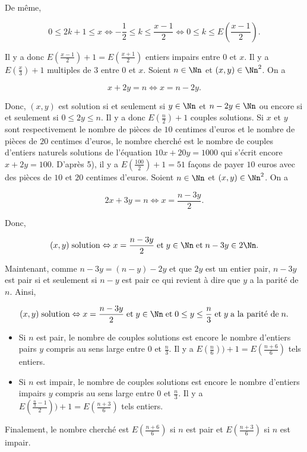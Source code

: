 {\begin{enumerate}
{De même,

$$0\leq2k+1\leq x\Leftrightarrow-\frac{1}{2}\leq k\leq\frac{x-1}{2}\Leftrightarrow0\leq k\leq E(\frac{x-1}{2}).$$

Il y a donc $E(\frac{x-1}{2})+1=E(\frac{x+1}{2})$ entiers impairs entre $0$ et $x$.
Il y a $E(\frac{x}{3})+1$ multiples de $3$ entre $0$ et $x$.
Soient $n\in\Nn$ et $(x,y)\in\Nn^2$. On a

$$x+2y=n\Leftrightarrow x=n-2y.$$

Donc, $(x,y)$ est solution si et seulement si $y\in\Nn$ et $n-2y\in\Nn$ ou encore si et seulement si $0\leq2y\leq n$.
Il y a donc $E(\frac{n}{2})+1$ couples solutions.
Si $x$ et $y$ sont respectivement le nombre de pièces de $10$ centimes d'euros et le nombre de pièces de $20$
centimes d'euros, le nombre cherché est le nombre de couples d'entiers naturels solutions de l'équation $10x+20y=1000$
qui s'écrit encore $x+2y=100$. D'après 5), il y a $E(\frac{100}{2})+1=51$ façons de payer $10$ euros avec des pièces de
$10$ et $20$ centimes d'euros.
Soient $n\in\Nn$ et $(x,y)\in\Nn^2$. On a

$$2x+3y=n\Leftrightarrow x=\frac{n-3y}{2}.$$

Donc,

$$(x,y)\;\mbox{solution}\Leftrightarrow x=\frac{n-3y}{2}\;\mbox{et}\;y\in\Nn\;\mbox{et}\;n-3y\in2\Nn.$$

Maintenant, comme $n-3y=(n-y)-2y$ et que $2y$ est un entier pair, $n-3y$ est pair si et seulement si $n-y$ est pair ce
qui revient à dire que $y$ a la parité de $n$. Ainsi,

$$(x,y)\;\mbox{solution}\Leftrightarrow x=\frac{n-3y}{2}\;\mbox{et}\;y\in\Nn\;\mbox{et}\;0\leq y\leq
\frac{n}{3}\;\mbox{et}\;y\;\mbox{a la parité de}\;n.$$

\begin{itemize}
\item[\textbf{1er cas.}] Si $n$ est pair, le nombre de couples solutions est encore le nombre d'entiers pairs $y$
compris au sens large entre $0$ et $\frac{n}{3}$. Il y a $E(\frac{n}{6}))+1=E(\frac{n+6}{6})$ tels entiers.
\item[\textbf{2ème cas.}] Si $n$ est impair, le nombre de couples solutions est encore le nombre d'entiers impairs $y$
compris au sens large entre $0$ et $\frac{n}{3}$. Il y a  $E(\frac{\frac{n}{3}-1}{2}))+1=E(\frac{n+3}{6})$ tels
entiers.
\end{itemize}
Finalement, le nombre cherché est $E(\frac{n+6}{6})$ si $n$ est pair et $E(\frac{n+3}{6})$ si $n$ est impair.
}
\end{enumerate}
}
